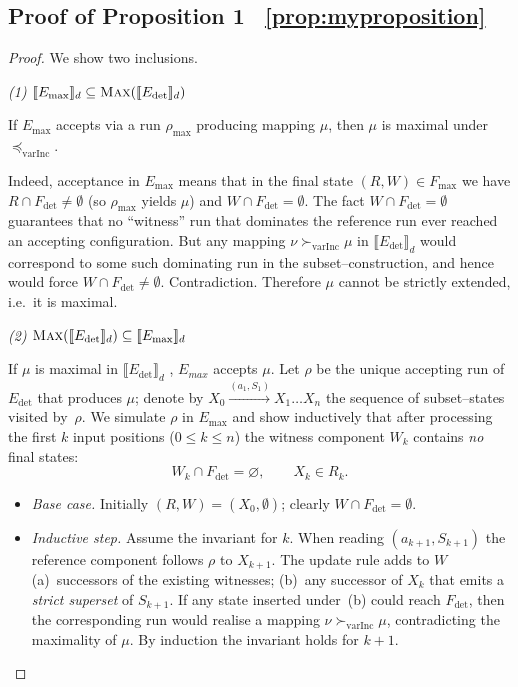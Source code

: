 
\subsection{Proof of Proposition 1 ~\ref{prop:myproposition}}


\begin{proof}
	We show two inclusions.
	
	\medskip\noindent\emph{(1) 	\(\llbracket E_{\max}\rrbracket_{d}
		\subseteq \textsc{Max}(\llbracket E_{\det}\rrbracket_{d})\)} 
		
	If \(E_{\max}\) accepts via a run \(\rho_{\max}\) producing mapping
	\(\mu\), then \(\mu\) is maximal under \(\preceq_{\mathrm{varInc}}\).
	
	Indeed, acceptance in \(E_{\max}\) means that in the final state
	\((R,W)\in F_{\max}\) we have
	\(R\cap F_{\det}\neq\emptyset\) (so \(\rho_{\max}\) yields \(\mu\))
	and \(W\cap F_{\det}=\emptyset\).  The fact
	\(W\cap F_{\det}=\emptyset\) guarantees that no “witness” run that
	dominates the reference run ever reached an accepting configuration.
	But any mapping \(\nu\succ_{\mathrm{varInc}}\mu\) in
	\(\llbracket E_{\det}\rrbracket_{d}\) would correspond to some such
	dominating run in the subset–construction, and hence would force
	\(W\cap F_{\det}\neq\emptyset\).  Contradiction.  Therefore \(\mu\)
	cannot be strictly extended, i.e.\ it is maximal.
	
	\medskip\noindent\emph{(2) 	\( \textsc{Max}(\llbracket E_{\det}\rrbracket_{d}) \subseteq \llbracket E_{\max}\rrbracket_{d}
		\)}
		
	If $\mu$ is maximal in \(\llbracket E_{\det}\rrbracket_{d}\) , $E_{max} $ accepts $\mu$. 	Let \(\rho\) be the unique accepting run of \(E_{\det}\) that
	produces \(\mu\);
	denote by
	\(X_{0}\xrightarrow{(a_{1},S_{1})}X_{1}\dots
	X_{n}\) the sequence of subset–states visited by~\(\rho\).
	We simulate \(\rho\) in \(E_{\max}\) and show inductively that after
	processing the first \(k\) input positions (\(0\le k\le n\))
	the witness component \(W_{k}\) contains \emph{no} final states:
	\[
	W_{k}\cap F_{\det} = \varnothing, 
	\qquad
	 X_{k} \in R_{k}.
	\]
	
	\begin{itemize}
		\item \emph{Base case.}  Initially \((R,W)=(X_{0},\emptyset)\);
		clearly \(W\cap F_{\det}=\emptyset\).
		
		\item \emph{Inductive step.}  Assume the invariant for \(k\).
		When reading \((a_{k+1},S_{k+1})\) the reference component follows
		\(\rho\) to \(X_{k+1}\).
		The update rule adds to \(W\)
		(a)~successors of the existing witnesses;
		(b)~any successor of \(X_{k}\) that emits a
		\emph{strict superset} of \(S_{k+1}\).
		If any state inserted under~(b) could reach \(F_{\det}\), then the
		corresponding run would realise a mapping
		\(\nu\succ_{\mathrm{varInc}}\mu\),
		contradicting the maximality of \(\mu\).
		By induction the invariant holds for \(k+1\).
		

\end{itemize}
\end{proof}
